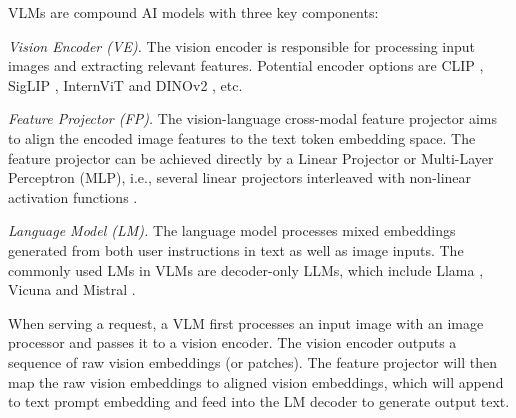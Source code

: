 VLMs are compound AI models with three key components:
\begin{denseitemize}
    \item \emph{Vision Encoder (VE).} The vision encoder is responsible for processing input images and extracting relevant features. 
    Potential encoder options are CLIP \cite{radford2021learning}, SigLIP \cite{zhai2023sigmoid}, InternViT \cite{chen2024internvl} and DINOv2 \cite{oquab2023dinov2}, etc. %
    \item \emph{Feature Projector (FP).} The vision-language cross-modal feature projector aims to align the encoded image features to the text token embedding space. 
    The feature projector can be achieved directly by a Linear Projector or Multi-Layer Perceptron (MLP), i.e., several linear projectors interleaved with non-linear activation functions \cite{llava}. %
    \item \emph{Language Model (LM).} The language model processes mixed embeddings generated from both user instructions in text as well as image inputs. 
    The commonly used LMs in VLMs are decoder-only LLMs, which include Llama \cite{touvron2023llama}, Vicuna \cite{vicuna2023} and Mistral \cite{jiang2023mistral}.
\end{denseitemize}

When serving a request, a VLM first processes an input image with an image processor and passes it to a vision encoder. 
The vision encoder outputs a sequence of raw vision embeddings (or patches). 
The feature projector will then map the raw vision embeddings to aligned vision embeddings, which will append to text prompt embedding and feed into the LM decoder to generate output text.


